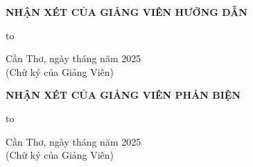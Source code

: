 \documentclass[13pt, a4paper]{report}
\begin{document}

\clearpage
\begin{center}
    \vspace*{1cm} %
    {\fontsize{14}{16}\bfseries\MakeUppercase{Nhận xét của Giảng viên hướng dẫn}}
    \par\vspace{1.5cm}
\end{center}

\begingroup
\offinterlineskip %
\par
\cleaders\vbox{\hbox to \linewidth{\hdashrule{\linewidth}{0.5pt}{2pt 2pt}}\kern 10pt}\vfill
\par
\endgroup

\noindent\hfill
\begin{minipage}{0.6\textwidth}
    \centering
    \fontsize{13}{15}\selectfont
    Cần Thơ, ngày \hspace{0.7cm} tháng \hspace{0.7cm} năm 2025 \\[1.5cm]
    (Chữ ký của Giảng Viên)
\end{minipage}
\hspace{1cm} %
\vspace*{1cm} %


\clearpage
\begin{center}
    \vspace*{1cm}
    {\fontsize{14}{16}\bfseries\MakeUppercase{Nhận xét của Giảng viên phản biện}}
    \par\vspace{1.5cm}
\end{center}

\begingroup
\offinterlineskip
\par
\cleaders\vbox{\hbox to \linewidth{\hdashrule{\linewidth}{0.5pt}{2pt 2pt}}\kern 10pt}\vfill
\par
\endgroup

\noindent\hfill
\begin{minipage}{0.6\textwidth}
    \centering
    \fontsize{13}{15}\selectfont
    Cần Thơ, ngày \hspace{0.7cm} tháng \hspace{0.7cm} năm 2025 \\[1.5cm]
    (Chữ ký của Giảng Viên)
\end{minipage}
\hspace{1cm}
\vspace*{1cm}
\end{document}

